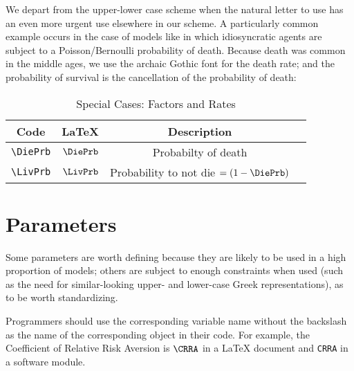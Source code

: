 \documentclass[12pt]{\econtex}
\begin{document}
We depart from the upper-lower case scheme when the natural letter to use has an even more urgent use elsewhere in our scheme.  A particularly common example occurs in the case of models like \cite{blanchardFinite} in which idiosyncratic agents are subject to a Poisson/Bernoulli probability of death.  Because death was common in the middle ages, we use the archaic Gothic font for the death rate; and the probability of survival is the cancellation of the probability of death:
\begin{table}[ht]
  \centering
  \begin{tabular}{|>{\ttfamily}cccl|} 		
    \hline
    Code & \LaTeX & Description &  \\ 
    \hline
    \verb|\DiePrb|     & $\DiePrb$     & Probabilty of death & 
    \\ \verb|\LivPrb|     & $\LivPrb$     & Probability to not die $=(1-\DiePrb)$ & 
    \\	\hline
  \end{tabular}
  \caption{Special Cases: Factors and Rates}
  \label{table:SpecialFactors}
\end{table}	

\section{Parameters}
Some parameters are worth defining because they are likely to be
used in a high proportion of models; others are subject to enough
constraints when used (such as the need for similar-looking upper-
and lower-case Greek representations), as to be worth standardizing.

Programmers should 
use the corresponding variable name without the backslash as the name of the corresponding object 
in their code.  For example, the Coefficient of Relative Risk Aversion is $\verb|\CRRA|$ in a \LaTeX 
document and \texttt{CRRA} in a software module.
\end{document}
